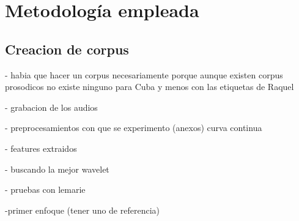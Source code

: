 \chapter{Metodolog\'ia empleada}

\section{Creacion de corpus}
- habia que hacer un corpus necesariamente porque aunque existen corpus prosodicos no existe ninguno para Cuba y menos con las etiquetas de Raquel




- grabacion de los audios

- preprocesamientos con que se experimento (anexos) curva continua

- features extraidos

- buscando la mejor wavelet

- pruebas con lemarie


-primer enfoque (tener uno de referencia)